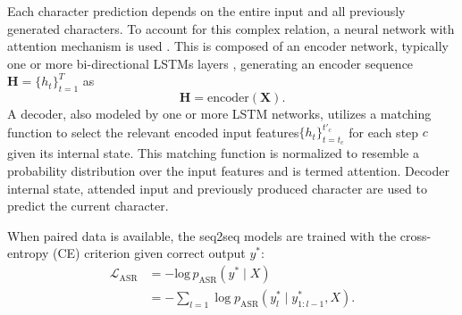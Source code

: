 \documentclass[a4paper]{article}
\begin{document}
Each character prediction depends on the entire input and all previously generated characters. To account for this complex relation, a neural network with attention mechanism is used \cite{bahdanau2014neural}. This is composed of an encoder network, typically one or more bi-directional LSTMs layers \cite{hochreiter1997long}, generating an encoder sequence $\mathbf{H}=\{h_t\}_{t=1}^T$ as
\begin{equation}
\mathbf{H} = \mathrm{encoder}(\mathbf{X}).
\label{encoder}
\end{equation}
A decoder, also modeled by one or more LSTM networks, utilizes a matching function to select the relevant encoded input features$\{h_t\}_{t=t_c}^{t'_c}$ for each step $c$ given its internal state. This matching function is normalized to resemble a probability distribution over the input features and is termed attention. Decoder internal state, attended input and previously produced character are used to predict the current character. 

When paired data is available, the seq2seq models are trained with the cross-entropy (CE) criterion given correct output $y^{*}$:
\begin{align}
\mathcal{L}_{\mathrm{ASR}}&=-\mbox{log}\,p_{\mathrm{ASR}}(y^{*}\mid{X}) \\\nonumber &=-\sum_{l=1}\log p_{\mathrm{ASR}}(y_{l}^{*}\mid{y}_{1:l-1}^{*},X).\label{eq:3}
\end{align}
\end{document}
